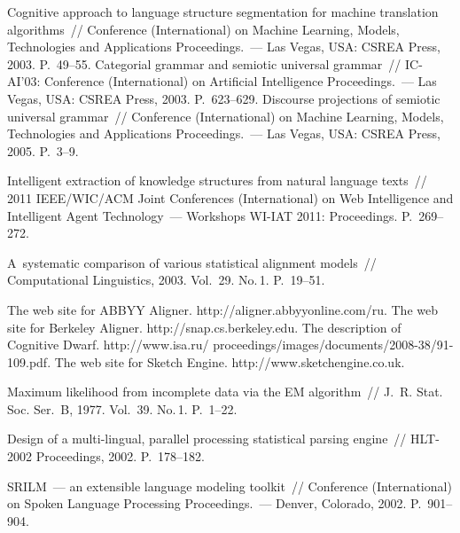 \begin{multicols}{2}
{{\begin{thebibliography}{99}
 Cognitive approach to language structure segmentation for machine translation
algorithms~// Conference (International) on Machine Learning, Models, Technologies and
Applications Proceedings.~--- Las Vegas, USA: CSREA Press, 2003. P.~49--55.
 Categorial grammar and semiotic universal grammar~// IC-AI'03: Conference
(International) on Artificial Intelligence Proceedings.~--- Las Vegas, USA: CSREA Press, 2003.
P.~623--629.
 Discourse projections of semiotic universal grammar~//
Conference (International) on Machine Learning, Models, Technologies and Applications
Proceedings.~--- Las Vegas, USA: CSREA Press, 2005. P.~3--9.

 Intelligent extraction of knowledge
structures from natural language texts~// 2011 IEEE/WIC/ACM Joint Conferences (International) on
Web Intelligence and Intelligent Agent Technology~--- Workshops WI-IAT 2011: Proceedings.
P.~269--272.

 A~systematic comparison of various statistical alignment models~//
Computational Linguistics, 2003. Vol.~29. No.\,1. P.~19--51.


The web site for ABBYY Aligner. {\sf http://aligner.\linebreak abbyyonline.com/ru}.
The web site for Berkeley Aligner. {\sf http://snap.cs.\linebreak berkeley.edu}.
The description of Cognitive Dwarf.
{\sf http://www.isa.ru/ proceedings/images/documents/2008-38/91-109.pdf}.
The web site for Sketch Engine. {\sf http://www.\linebreak sketchengine.co.uk}.


 Maximum likelihood from incomplete data via the
EM algorithm~// J.~R. Stat. Soc. Ser.~B, 1977. Vol.~39. No.\,1. P.~1--22.

 Design of a multi-lingual, parallel processing statistical parsing engine~// HLT-2002
Proceedings, 2002. P.~178--182.

 SRILM~---  an extensible language modeling toolkit~//
Conference (International) on Spoken Language Processing Proceedings.~---
Denver, Colorado, 2002. P.~901--904.


\end{thebibliography}}}
\end{multicols}
